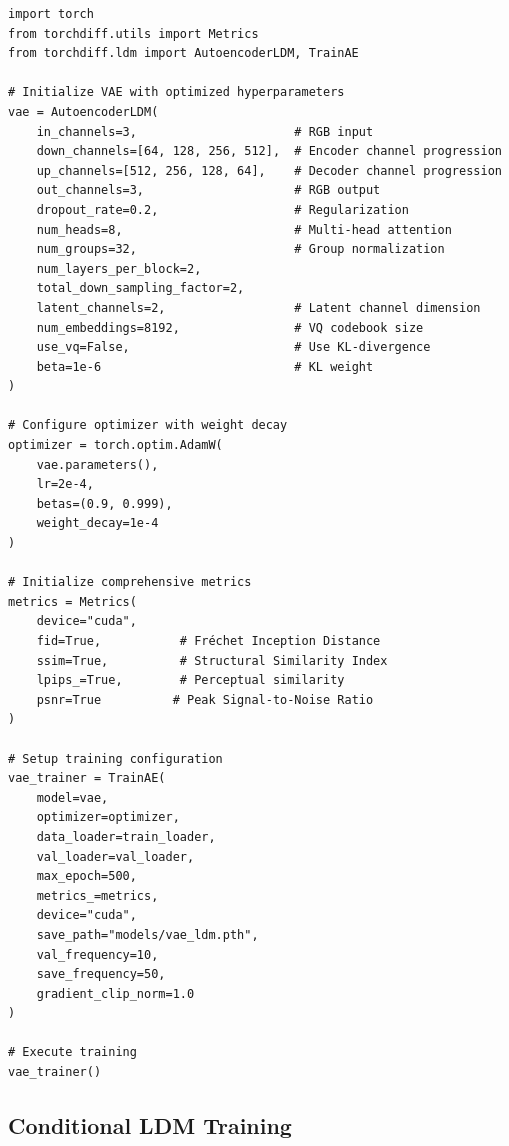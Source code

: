 \documentclass[12pt,twoside]{article}
\begin{document}
\begin{lstlisting}[caption={VAE model training with TorchDiff}, label={lst:vae_training}]
import torch
from torchdiff.utils import Metrics
from torchdiff.ldm import AutoencoderLDM, TrainAE

# Initialize VAE with optimized hyperparameters
vae = AutoencoderLDM(
    in_channels=3,                      # RGB input
    down_channels=[64, 128, 256, 512],  # Encoder channel progression
    up_channels=[512, 256, 128, 64],    # Decoder channel progression  
    out_channels=3,                     # RGB output
    dropout_rate=0.2,                   # Regularization
    num_heads=8,                        # Multi-head attention
    num_groups=32,                      # Group normalization
    num_layers_per_block=2,            
    total_down_sampling_factor=2,      
    latent_channels=2,                  # Latent channel dimension
    num_embeddings=8192,                # VQ codebook size
    use_vq=False,                       # Use KL-divergence
    beta=1e-6                           # KL weight
)

# Configure optimizer with weight decay
optimizer = torch.optim.AdamW(
    vae.parameters(),
    lr=2e-4,
    betas=(0.9, 0.999),
    weight_decay=1e-4
)

# Initialize comprehensive metrics
metrics = Metrics(
    device="cuda",
    fid=True,           # Fréchet Inception Distance
    ssim=True,          # Structural Similarity Index
    lpips_=True,        # Perceptual similarity
    psnr=True          # Peak Signal-to-Noise Ratio
)

# Setup training configuration
vae_trainer = TrainAE(
    model=vae,
    optimizer=optimizer,
    data_loader=train_loader,
    val_loader=val_loader,
    max_epoch=500,
    metrics_=metrics,
    device="cuda",
    save_path="models/vae_ldm.pth",
    val_frequency=10,
    save_frequency=50,
    gradient_clip_norm=1.0
)

# Execute training
vae_trainer()
\end{lstlisting}

\subsection{Conditional LDM Training}
\label{subsec:conditional_ldm_training}
\end{document}
